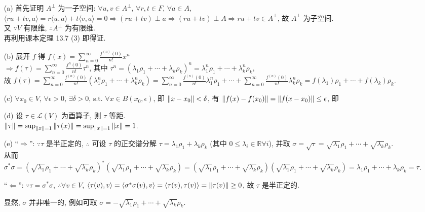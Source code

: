 \documentclass{assignment}
\begin{document}
\begin{sol}
    \begin{itemize}
        \item[(a)] 首先证明 $A^{\perp}$ 为一子空间: $\forall u,v\in A^{\perp}$, $\forall r,t\in F$, $\forall a\in A$, $\langle ru+tv,a\rangle=r\langle u,a\rangle+t\langle v,a\rangle=0\Longrightarrow(ru+tv)\perp a\Longrightarrow(ru+tv)\perp A\Longrightarrow ru+tv\in A^{\perp}$, 故 $A^{\perp}$ 为子空间.\\
        又 $\because V$ 有限维, $\therefore A^{\perp}$ 为有限维.\\
        再利用课本定理 13.7 (3) 即得证.
        \item[(b)] 展开 $f$ 得 $f(x)=\sum_{n=0}^{\infty}\frac{f^{(n)}(0)}{n!}x^n$\\
        $\Longrightarrow f(\tau)=\sum_{n=0}^{\infty}\frac{f^{n}(0)}{n!}\tau^n$, 其中 $\tau^n=(\lambda_1\rho_1+\cdots+\lambda_k\rho_k)^n=\lambda_1^n\rho_1+\cdots+\lambda_k^n\rho_k$,\\
        故 $f(\tau)=\sum_{n=0}^{\infty}\frac{f^{(n)}(0)}{n!}(\lambda_1^n\rho_1+\cdots+\lambda_k^n\rho_k)=\sum_{n=0}^{\infty}\frac{f^{(n)}(0)}{n!}\lambda_1^n\rho_1+\cdots+\sum_{n=0}^{\infty}\frac{f^{(n)}(0)}{n!}\lambda_k^n\rho_k=f(\lambda_1)\rho_1+\cdots+f(\lambda_k)\rho_k$.
        \item[(c)] $\forall x_0\in V$, $\forall\epsilon>0$, $\exists\delta>0$, s.t. $\forall x\in B(x_0,\epsilon)$, 即 $\left\lVert x-x_0\right\rVert<\delta$, 有 $\left\lVert f(x)-f(x_0)\right\rVert=\left\lVert f(x-x_0)\right\rVert\leq\epsilon$, 即
        \item[(d)] 设 $\tau\in\mathcal{L}(V)$ 为酉算子, 则 $\tau$ 等距.\\
        $\left\lVert\tau\right\rVert=\sup_{\left\lVert x\right\rVert=1}\left\lVert\tau(x)\right\rVert=\sup_{\left\lVert x\right\rVert=1}\left\lVert x\right\rVert=1$.
        \item[(e)] ``$\Longrightarrow$'': $\because\tau$ 是半正定的, $\therefore$ 可设 $\tau$ 的正交谱分解 $\tau=\lambda_1\rho_1+\lambda_k\rho_k$ (其中 $0\leq\lambda_i\in\mathbb{R}\forall i$), 并取 $\sigma=\sqrt{\tau}=\sqrt{\lambda_1}\rho_1+\cdots+\sqrt{\lambda_k}\rho_k$.\\
        从而 $\sigma^*\sigma=(\sqrt{\lambda_1}\rho_1+\cdots+\sqrt{\lambda_k}\rho_k)^*(\sqrt{\lambda_1}\rho_1+\cdots+\sqrt{\lambda_k}\rho_k)=(\sqrt{\lambda_1}\rho_1+\cdots+\sqrt{\lambda_k}\rho_k)(\sqrt{\lambda_1}\rho_1+\cdots+\sqrt{\lambda_k}\rho_k)=\lambda_1\rho_1+\cdots+\lambda_k\rho_k=\tau$.

        ``$\Longleftarrow$'': $\because\tau=\sigma^*\sigma$, $\therefore\forall v\in V$, $\langle\tau(v),v\rangle=\langle\sigma^*\sigma(v),v\rangle=\langle\tau(v),\tau(v)\rangle=\left\lVert\tau(v)\right\rVert\geq 0$, 故 $\tau$ 是半正定的.

        显然, $\sigma$ 并非唯一的, 例如可取 $\sigma=-\sqrt{\lambda_1}\rho_1+\cdots+\sqrt{\lambda_k}\rho_k$.
    \end{itemize}
\end{sol}
\end{document}
